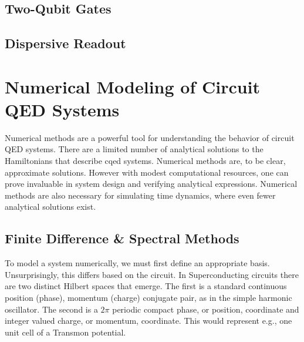 \subsection{Two-Qubit Gates}

\subsection{Dispersive Readout}






\section{Numerical Modeling of Circuit QED Systems}

Numerical methods are a powerful tool for understanding the behavior of circuit QED systems.
There are a limited number of analytical solutions to the Hamiltonians that describe \gls{cqed} systems.
Numerical methods are, to be clear, approximate solutions.
However with modest computational resources, one can prove invaluable in system design and verifying analytical expressions.
Numerical methods are also necessary for simulating time dynamics, where even fewer analytical solutions exist.

\subsection{Finite Difference \& Spectral Methods}

To model a system numerically, we must first define an appropriate basis. Unsurprisingly, this differs based on the circuit.
In Superconducting circuits there are two distinct Hilbert spaces that emerge.
The first is a standard continuous position (phase), momentum (charge) conjugate pair, as in the simple harmonic oscillator. 
The second is a $2\pi$ periodic compact phase, or position, coordinate and integer valued charge, or momentum, coordinate. This would represent e.g., one unit cell of a Transmon potential.

